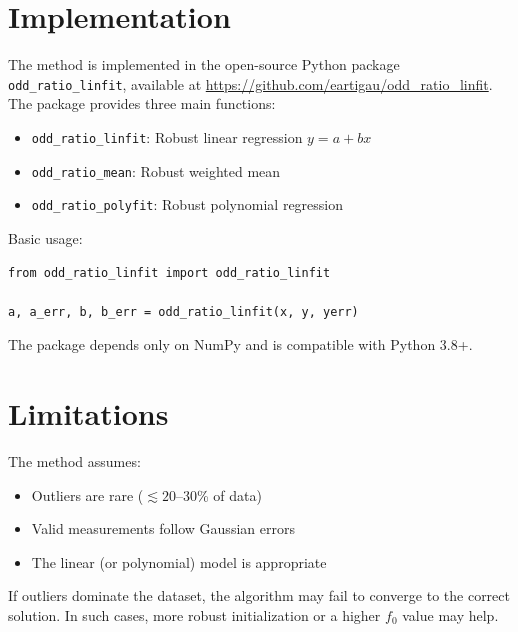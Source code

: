 \documentclass[twocolumn]{aastex631}
\begin{document}
\section{Implementation}
\label{sec:implementation}

The method is implemented in the open-source Python package \texttt{odd\_ratio\_linfit},
available at \url{https://github.com/eartigau/odd_ratio_linfit}. The package provides
three main functions:

\begin{itemize}
    \item \texttt{odd\_ratio\_linfit}: Robust linear regression $y = a + bx$
    \item \texttt{odd\_ratio\_mean}: Robust weighted mean
    \item \texttt{odd\_ratio\_polyfit}: Robust polynomial regression
\end{itemize}

Basic usage:
\begin{verbatim}
from odd_ratio_linfit import odd_ratio_linfit

a, a_err, b, b_err = odd_ratio_linfit(x, y, yerr)
\end{verbatim}

The package depends only on NumPy and is compatible with Python 3.8+.


\section{Limitations}
\label{sec:limitations}

The method assumes:
\begin{itemize}
    \item Outliers are rare ($\lesssim 20$--30\% of data)
    \item Valid measurements follow Gaussian errors
    \item The linear (or polynomial) model is appropriate
\end{itemize}

If outliers dominate the dataset, the algorithm may fail to converge to the correct
solution. In such cases, more robust initialization or a higher $f_0$ value may help.
\end{document}
